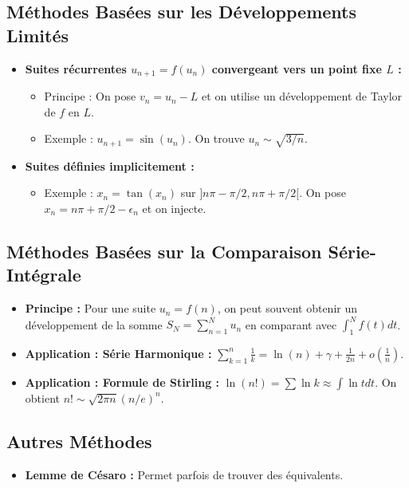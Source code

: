 \documentclass[12pt, a4paper, parskip=full]{report}
\theoremstyle{agregstyle}
\begin{document}
\subsection{Méthodes Basées sur les Développements Limités}
\begin{itemize}
    \item \textbf{Suites récurrentes $u_{n+1}=f(u_n)$ convergeant vers un point fixe $L$ :}
        \begin{itemize}
            \item Principe : On pose $v_n = u_n - L$ et on utilise un développement de Taylor de $f$ en $L$.
            \item Exemple : $u_{n+1} = \sin(u_n)$. On trouve $u_n \sim \sqrt{3/n}$.
        \end{itemize}
    \item \textbf{Suites définies implicitement :}
        \begin{itemize}
            \item Exemple : $x_n = \tan(x_n)$ sur $]n\pi - \pi/2, n\pi + \pi/2[$. On pose $x_n = n\pi + \pi/2 - \epsilon_n$ et on injecte.
        \end{itemize}
\end{itemize}
\subsection{Méthodes Basées sur la Comparaison Série-Intégrale}
\begin{itemize}
    \item \textbf{Principe :} Pour une suite $u_n = f(n)$, on peut souvent obtenir un développement de la somme $S_N = \sum_{n=1}^N u_n$ en comparant avec $\int_1^N f(t)dt$.
    \item \textbf{Application : Série Harmonique :} $\sum_{k=1}^n \frac{1}{k} = \ln(n) + \gamma + \frac{1}{2n} + o(\frac{1}{n})$.
    \item \textbf{Application : Formule de Stirling :} $\ln(n!) = \sum \ln k \approx \int \ln t dt$. On obtient $n! \sim \sqrt{2\pi n} (n/e)^n$.
\end{itemize}
\subsection{Autres Méthodes}
\begin{itemize}
    \item \textbf{Lemme de Césaro :} Permet parfois de trouver des équivalents.
\end{itemize}
\end{document}
